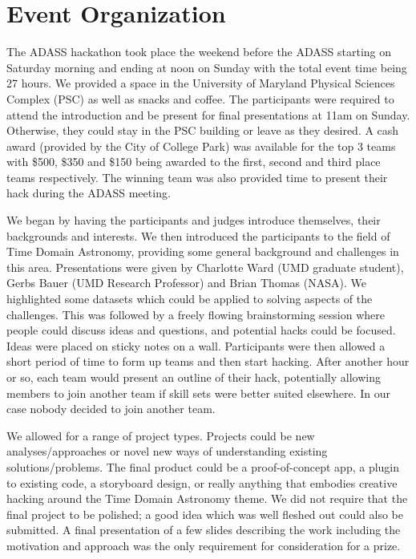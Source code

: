 \documentclass[11pt,twoside]{article}
\begin{document}
\section{Event Organization}

The ADASS hackathon took place the weekend before the ADASS starting on Saturday morning and ending at noon on Sunday with the total event time being 27 hours. We provided a space in the University of Maryland Physical Sciences Complex (PSC) as well as snacks and coffee. The participants were required to attend the introduction and be present for final presentations at 11am on Sunday. Otherwise, they could stay in the PSC building or leave as they desired. A cash award (provided by the City of College Park) was available for the top 3 teams with \$500, \$350 and \$150 being awarded to the first, second and third place teams respectively. The winning team was also provided time to present their hack during the ADASS meeting.
 
We began by having the participants and judges introduce themselves, their backgrounds and interests.  We then introduced the participants to the field of Time Domain Astronomy, providing some general background and challenges in this area. Presentations were given by Charlotte Ward (UMD graduate student), Gerbs Bauer (UMD Research Professor) and Brian Thomas (NASA). We highlighted some datasets which could be applied to solving aspects of the challenges. This was followed by a freely flowing brainstorming session where people could discuss ideas and questions, and potential hacks could be focused. Ideas were placed on sticky notes on a wall. Participants were then allowed a short period of time to form up teams and then start hacking. After another hour or so, each team would present an outline of their hack, potentially allowing members to join another team if skill sets were better suited elsewhere. In our case nobody decided to join another team.

We allowed for a range of project types. Projects could be new analyses/approaches or novel new ways of understanding existing solutions/problems. The final product could be a proof-of-concept app, a plugin to existing code, a storyboard design, or really anything that embodies creative hacking around the Time Domain Astronomy theme. We did not require that the final project to be polished; a good idea which was well fleshed out could also be submitted. A final presentation of a few slides describing the work including the motivation and approach was the only requirement for consideration for a prize.
\end{document}

